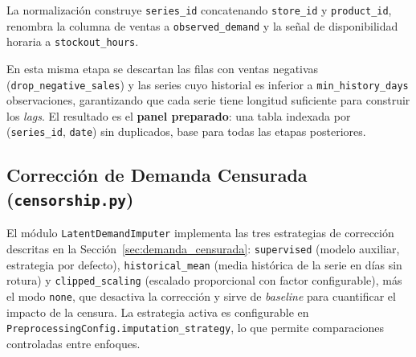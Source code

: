 La normalización construye \texttt{series\_id} concatenando \texttt{store\_id} y \texttt{product\_id}, renombra la columna de ventas a \texttt{observed\_demand} y la señal de disponibilidad horaria a \texttt{stockout\_hours}.

En esta misma etapa se descartan las filas con ventas negativas (\texttt{drop\_\allowbreak{}negative\_\allowbreak{}sales}) y las series cuyo historial es inferior a \texttt{min\_\allowbreak{}history\_\allowbreak{}days} observaciones, garantizando que cada serie tiene longitud suficiente para construir los \textit{lags}. El resultado es el \textbf{panel preparado}: una tabla indexada por (\texttt{series\_id}, \texttt{date}) sin duplicados, base para todas las etapas posteriores.

\subsection{Corrección de Demanda Censurada (\texttt{censorship.py})}

El módulo \texttt{LatentDemandImputer} implementa las tres estrategias de corrección descritas en la Sección~\ref{sec:demanda_censurada}: \texttt{supervised} (modelo auxiliar, estrategia por defecto), \texttt{historical\_\allowbreak{}mean} (media histórica de la serie en días sin rotura) y \texttt{clipped\_\allowbreak{}scaling} (escalado proporcional con factor configurable), más el modo \texttt{none}, que desactiva la corrección y sirve de \textit{baseline} para cuantificar el impacto de la censura. La estrategia activa es configurable en \texttt{PreprocessingConfig.}\allowbreak\texttt{imputation\_}\allowbreak\texttt{strategy}, lo que permite comparaciones controladas entre enfoques.

